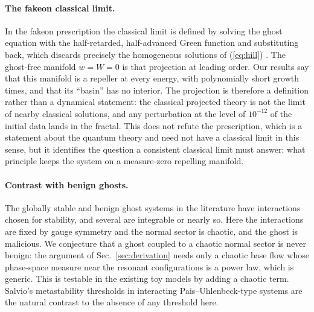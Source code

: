 \documentclass[11pt,a4paper]{article}
\begin{document}
\paragraph{The fakeon classical limit.} In the fakeon prescription the classical limit is
defined by solving the ghost equation with the half-retarded, half-advanced Green function and
substituting back, which discards precisely the homogeneous solutions of (\ref{eq:hill})
\cite{Anselmi18}. The ghost-free manifold $w=W=0$ is that projection at leading order. Our
results say that this manifold is a repeller at every energy, with polynomially short growth
times, and that its ``basin'' has no interior. The projection is therefore a definition rather
than a dynamical statement: the classical projected theory is not the limit of nearby classical
solutions, and any perturbation at the level of $10^{-12}$ of the initial data lands in the
fractal. This does not refute the prescription, which is a statement about the quantum theory and
need not have a classical limit in this sense, but it identifies the question a consistent
classical limit must answer: what principle keeps the system on a measure-zero repelling manifold.

\paragraph{Contrast with benign ghosts.} The globally stable and benign ghost systems in the
literature \cite{DMV22,DamourSmilga,Smilga} have interactions chosen for stability, and several
are integrable or nearly so. Here the interactions are fixed by gauge symmetry and the normal
sector is chaotic, and the ghost is malicious. We conjecture that a ghost coupled to a chaotic
normal sector is never benign: the argument of Sec.~\ref{sec:derivation} needs only a chaotic base
flow whose phase-space measure near the resonant configurations is a power law, which is generic.
This is testable in the existing toy models by adding a chaotic term. Salvio's metastability
thresholds \cite{Salvio19} in interacting Pais--Uhlenbeck-type systems are the natural contrast to
the absence of any threshold here.
\end{document}
